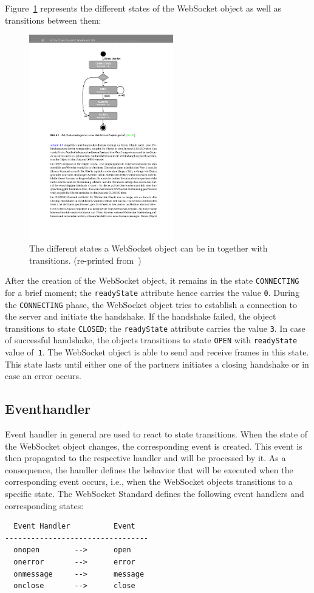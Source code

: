 \documentclass[a4paper, justified, notoc]{tufte-handout} %
\begin{document}
Figure~\ref{fig:states} represents the different states of the WebSocket object as well as transitions between them:
\begin{figure}%
	\centering
  \includegraphics[width=0.56\textwidth]{./figures/states.pdf}
  \caption{The different states a WebSocket object can be in together with transitions. (re-printed from~\citet{gorski:2015})}
  \label{fig:states}
\end{figure}

After the creation of the WebSocket object, it remains in the state \texttt{CONNECTING} for a brief moment; the \texttt{readyState} attribute hence carries the value \texttt{0}. During the \texttt{CONNECTING} phase, the WebSocket object tries to establish a connection to the server and initiate the handshake. If the handshake failed, the object transitions to state \texttt{CLOSED}; the \texttt{readyState} attribute carries the value \texttt{3}. In case of successful handshake, the objects transitions to state \texttt{OPEN} with \texttt{readyState} value of~\texttt{1}. The WebSocket object is able to send and receive frames in this state. This state lasts until either one of the partners initiates a closing handshake or in case an error occurs.

\subsection{Eventhandler} %
\label{sub:eventhandler}

Event handler in general are used to react to state transitions. When the state of the WebSocket object changes, the corresponding event is created. This event is then propagated to the respective handler and will be processed by it. As a consequence, the handler defines the behavior that will be executed when the corresponding event occurs, i.e., when the WebSocket objects transitions to a specific state. The WebSocket Standard defines the following event handlers and corresponding states:
\begin{Verbatim}
  Event Handler          Event
---------------------------------
  onopen        -->      open
  onerror       -->      error
  onmessage     -->      message
  onclose       -->      close
\end{Verbatim}
\end{document}
